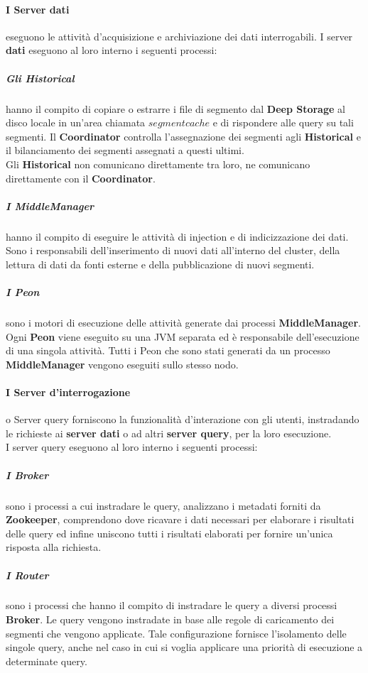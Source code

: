 \paragraph{I Server dati} eseguono le attività d'acquisizione e archiviazione dei dati interrogabili.
I server \textbf{dati} eseguono al loro interno i seguenti processi:
\subparagraph{Gli Historical} hanno il compito di copiare o estrarre i file di segmento dal \textbf{Deep Storage} al disco locale in un’area
chiamata $segment cache$ e di rispondere alle query su tali segmenti.
Il \textbf{Coordinator} controlla l’assegnazione dei segmenti agli \textbf{Historical} e il bilanciamento dei segmenti assegnati
a questi ultimi.\\ 
Gli \textbf{Historical} non comunicano direttamente tra loro, ne comunicano direttamente con il \textbf{Coordinator}. 
\subparagraph{I MiddleManager} 
hanno il compito di eseguire le attività di \gls{injection}{} e di indicizzazione dei dati.\\
Sono i responsabili dell'inserimento di nuovi dati all'interno del \gls{cluster}{}, della lettura di dati da fonti esterne e della pubblicazione di 
nuovi segmenti.\\
\subparagraph{I Peon} sono i motori di esecuzione delle attività generate dai processi \textbf{MiddleManager}. \\
Ogni \textbf{Peon} viene eseguito su una JVM separata ed è responsabile dell’esecuzione di una singola attività. 
Tutti i Peon che sono stati generati da un processo \textbf{MiddleManager} vengono eseguiti sullo stesso nodo.
\paragraph{I Server d'interrogazione} o Server query forniscono la funzionalità d'interazione con gli utenti, instradando le richieste  
ai \textbf{server dati} o ad altri \textbf{server query}, per la loro esecuzione. \\
I server query eseguono al loro interno i seguenti processi:
\subparagraph{I Broker} sono i processi a cui instradare le query, analizzano i \gls{metadati}{} forniti
da \textbf{Zookeeper}, comprendono dove ricavare i dati necessari per elaborare i risultati delle query ed 
infine uniscono tutti i risultati elaborati per fornire un’unica risposta alla richiesta.\\
\subparagraph{I Router} sono i processi che hanno il compito di instradare le query a diversi processi \textbf{Broker}. Le query
vengono instradate in base alle regole di caricamento dei segmenti che vengono applicate.
Tale configurazione fornisce l’isolamento delle singole query, anche nel caso in cui si voglia applicare 
una priorità di esecuzione a determinate query.\\

